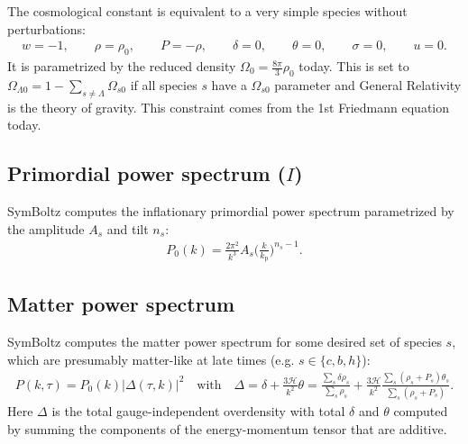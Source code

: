 \documentclass{aa}
\newcommand\TODO[1]{\textcolor{red}{(\textbf{TODO:} #1)}}
\newcommand\scrH{\mathscr{H}}
\begin{document}
The cosmological constant is equivalent to a very simple species without perturbations:
\begin{align*}
    w = -1 , \qquad
    \rho = \rho_0, \qquad
    P = -\rho , \qquad
    \delta = 0 , \qquad
    \theta = 0 , \qquad
    \sigma = 0 , \qquad
    u = 0 .
\end{align*}
It is parametrized by the reduced density $\Omega_0 = \frac{8\pi}{3} \rho_0$ today.
This is set to $\Omega_{\Lambda 0} = 1 - \sum_{s \neq \Lambda} \Omega_{s0}$ if all species $s$ have a $\Omega_{s0}$ parameter and General Relativity is the theory of gravity.
This constraint comes from the 1st Friedmann equation today.



\subsection{Primordial power spectrum \texorpdfstring{($I$)}{(I)}}
\label{sec:primordial}

SymBoltz computes the inflationary primordial power spectrum parametrized by the amplitude $A_s$ and tilt $n_s$:
\begin{align*}
    P_0(k) = \frac{2\pi^2}{k^3} A_s \bigg(\frac{k}{k_\text{p}}\bigg)^{n_s-1}.
\end{align*}

\subsection{Matter power spectrum}
\label{sec:matter}

SymBoltz computes the matter power spectrum for some desired set of species $s$, which are presumably matter-like at late times (e.g. $s \in \{c,b,h\}$):
\begin{align*}
    P(k,\tau) = P_0(k) \big|\Delta(\tau,k)\big|^2
    \quad \text{with} \quad
    \Delta = \delta + \frac{3 \scrH}{k^2} \theta = \frac{\sum_s \delta\rho_s}{\sum_s \rho_s} + \frac{3 \scrH}{k^2} \frac{\sum_s (\rho_s+P_s)\theta_s}{\sum_s (\rho_s+P_s)} .
\end{align*}
Here $\Delta$ is the total gauge-independent overdensity with total $\delta$ and $\theta$ computed by summing the components of the energy-momentum tensor that are additive.
\end{document}
